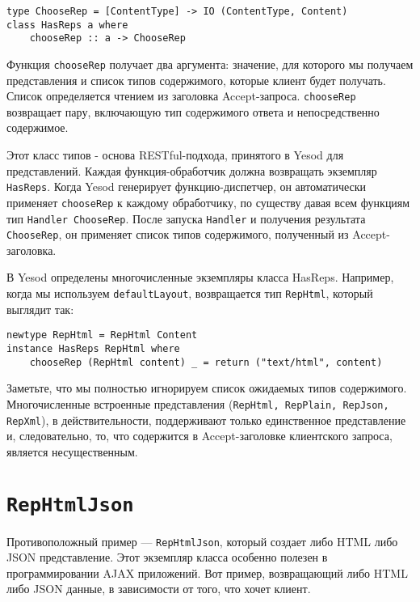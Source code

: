 \begin{lstlisting}
type ChooseRep = [ContentType] -> IO (ContentType, Content)
class HasReps a where
    chooseRep :: a -> ChooseRep
\end{lstlisting}

Функция \lstinline`chooseRep` получает два аргумента: значение, для которого мы получаем представления и список типов содержимого, которые клиент будет получать. Список определяется чтением из заголовка Accept-запроса. \lstinline`chooseRep` возвращает пару, включающую тип содержимого ответа и непосредственно содержимое.

Этот класс типов - основа RESTful-подхода, принятого в Yesod для представлений. Каждая функция-обработчик должна возвращать экземпляр \lstinline`HasReps`. Когда Yesod генерирует функцию-диспетчер, он автоматически применяет \lstinline'chooseRep' к каждому обработчику, по существу давая всем функциям тип \lstinline'Handler ChooseRep'. После  запуска \lstinline'Handler' и получения результата \lstinline'ChooseRep',  он применяет список типов содержимого, полученный из Accept-заголовка.

В Yesod определены многочисленные экземпляры класса HasReps. Например, когда мы используем \lstinline`defaultLayout`, возвращается тип \lstinline'RepHtml', который выглядит так:

\begin{lstlisting}
newtype RepHtml = RepHtml Content
instance HasReps RepHtml where
    chooseRep (RepHtml content) _ = return ("text/html", content)
\end{lstlisting}

Заметьте, что мы полностью игнорируем список ожидаемых типов содержимого. Многочисленные встроенные представления (\lstinline'RepHtml, RepPlain, RepJson, RepXml'), в действительности, поддерживают только единственное представление и, следовательно, то, что содержится в Accept-заголовке клиентского запроса, является несущественным.

\section{\lstinline'RepHtmlJson'}

Противоположный пример --- \lstinline'RepHtmlJson', который создает либо HTML либо JSON представление. Этот экземпляр класса особенно полезен в программировании AJAX приложений. Вот пример, возвращающий либо HTML либо JSON данные, в зависимости от того, что хочет клиент. 


